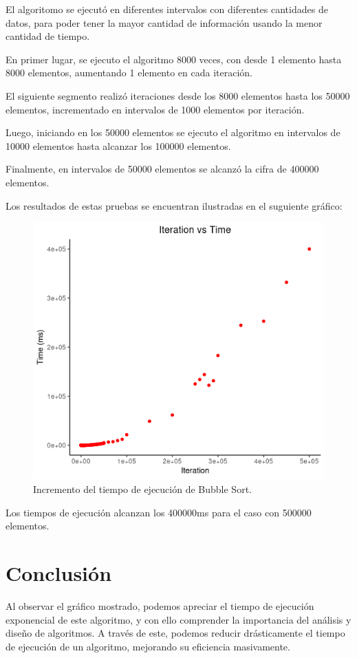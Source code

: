\documentclass[paper=a4, fontsize=11pt]{scrartcl} %
\numberwithin{equation}{section} %
\numberwithin{figure}{section} %
\numberwithin{table}{section} %
\begin{document}
    El algoritomo se ejecutó en diferentes intervalos con diferentes cantidades de datos,
    para poder tener la mayor cantidad de información usando la menor cantidad de tiempo.

    En primer lugar, se ejecuto el algoritmo 8000 veces, con desde 1 elemento hasta 8000 elementos,
    aumentando 1 elemento en cada iteración.

    El siguiente segmento realizó iteraciones desde los 8000 elementos hasta los 50000 elementos,
    incrementado en intervalos de 1000 elementos por iteración.

    Luego, iniciando en los 50000 elementos se ejecuto el algoritmo en intervalos de 10000 elementos
    hasta alcanzar los 100000 elementos.

    Finalmente, en intervalos de 50000 elementos se alcanzó la cifra de 400000 elementos.

    Los resultados de estas pruebas se encuentran ilustradas en el suguiente gráfico:

\begin{figure}
    \includegraphics[width=\linewidth]{Rplot.png}
    \caption{Incremento del tiempo de ejecución de Bubble Sort.}
\end{figure}

    Los tiempos de ejecución alcanzan los 400000ms para el caso con 500000 elementos.

\section{Conclusión}\label{sec:conclusión}

    Al observar el gráfico mostrado, podemos apreciar el tiempo de ejecución exponencial
    de este algoritmo, y con ello comprender la importancia del análisis y diseño de algoritmos.
    A través de este, podemos reducir drásticamente el tiempo de ejecución de un algoritmo,
    mejorando su eficiencia masivamente.

\end{document}
